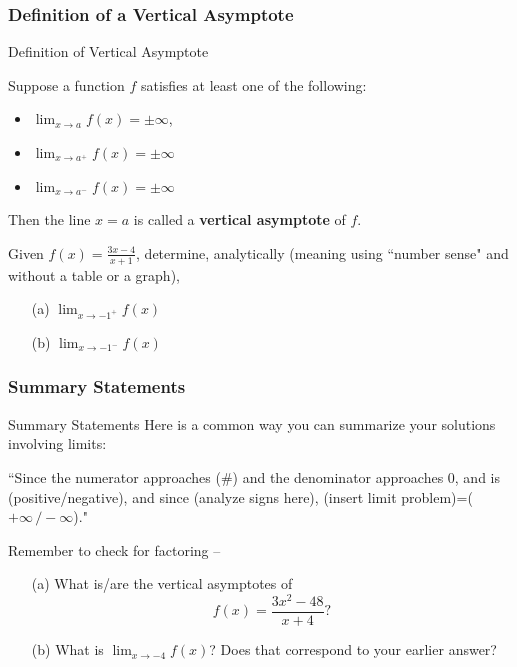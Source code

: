 \documentclass[Cal1Spr16Lectures.tex]{subfiles}
\begin{document}
\subsubsection{Definition of a Vertical Asymptote}
\begin{frame}{\small Definition of Vertical Asymptote}
\begin{dfn} Suppose a function $f$ satisfies at least one of the following: 

\begin{itemize}
\item $\displaystyle\lim_{x \to a} f(x) = \pm\infty$,
\item $\displaystyle\lim_{x \to a^+} f(x) = \pm\infty$
\item $\displaystyle\lim_{x \to a^-} f(x) = \pm\infty$
\end{itemize}

Then the line $x=a$ is called a {\bf vertical asymptote} of $f$. \end{dfn}
\end{frame}

\begin{frame}
\begin{exe} Given $f(x)=\frac{3x-4}{x+1}$, determine, analytically (\alert{meaning using ``number sense" and without a table or a graph}), 

\begin{itemize}
\item[(a)\;] $\displaystyle\lim_{x \to -1^+} f(x)$ 
\item[(b)\;] $\displaystyle\lim_{x \to -1^-} f(x)$
\end{itemize}
\end{exe}
\end{frame}

\subsubsection{Summary Statements}
\begin{frame}{\small Summary Statements}
Here is a common way you can summarize your solutions involving limits:

\vspace{1pc}
``Since the numerator approaches \alert{(\#)} and the denominator approaches $0$, and is \alert{(positive/negative)}, and since \alert{(analyze signs here)}, \alert{(insert limit problem)}=\alert{($+\infty\,/-\infty$)}."
\end{frame}

\begin{frame}
Remember to check for factoring -- 

\begin{exe} \begin{itemize}
\item[(a)] What is/are the vertical asymptotes of 
\[f(x)=\frac{3x^2-48}{x+4} ?\]
\item[(b)] What is $\displaystyle\lim_{x \to -4} f(x)$?  Does that correspond to your earlier answer?
\end{itemize}
\end{exe}
\end{frame}
\end{document}
